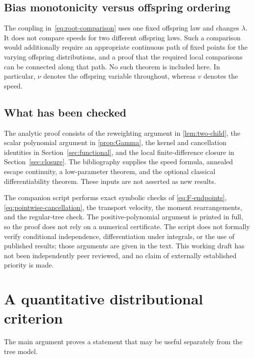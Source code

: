 \documentclass[11pt,a4paper]{article}
\numberwithin{equation}{section}
\theoremstyle{plain}
\theoremstyle{definition}
\theoremstyle{remark}
\begin{document}
\subsection{Bias monotonicity versus offspring ordering}

The coupling in~\eqref{eq:root-comparison} uses one fixed offspring law and
changes $\lambda$.  It does not compare speeds for two different offspring
laws.  Such a comparison would additionally require an appropriate
continuous path of fixed points for the varying offspring distributions,
and a proof that the required local comparisons can be connected along
that path.  No such theorem is included here.  In particular,
$\nu$ denotes the offspring variable throughout, whereas $v$ denotes the
speed.

\subsection{What has been checked}

The analytic proof consists of the reweighting argument in
\cref{lem:two-child}, the scalar polynomial argument in
\cref{prop:Gamma}, the kernel and cancellation identities in
Section~\ref{sec:functional}, and the local finite-difference closure in
Section~\ref{sec:closure}.  The bibliography supplies the speed formula,
annealed escape continuity, a low-parameter theorem, and the optional
classical differentiability theorem.  These inputs are not asserted as
new results.

The companion script performs exact symbolic checks of
\eqref{eq:F-endpoints}, \eqref{eq:pointwise-cancellation}, the transport
velocity, the moment rearrangements, and the regular-tree check.
The positive-polynomial argument is printed in full, so the proof does
not rely on a numerical certificate.  The script does not formally
verify conditional independence, differentiation under integrals, or the
use of published results; those arguments are given in the text.  This
working draft has not been independently peer reviewed, and no claim of
externally established priority is made.

\appendix
\section{A quantitative distributional criterion}\label{app:criterion}

The main argument proves a statement that may be useful separately from
the tree model.
\end{document}
